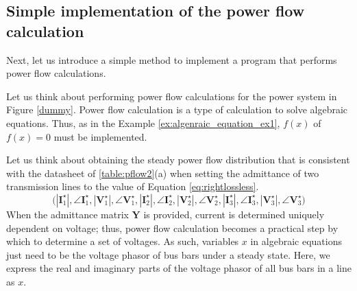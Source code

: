 \documentclass[tombow,dvipdfmx]{corona-a5-1.1}
\begin{document}
\subsection{Simple implementation of the power flow calculation}

Next, let us introduce a simple method to implement a program that performs power flow calculations.

\begin{例}\label{ex:simplepowerflow}
Let us think about performing power flow calculations for the power system in Figure \ref{dummy}.
Power flow calculation is a type of calculation to solve algebraic equations. Thus, as in the Example \nobreak\ref{ex:algenraic_equation_ex1}, $f(x)$ of $f(x)=0$ must be implemented.

Let us think about obtaining the steady power flow distribution that is consistent with the datasheet of \ref{table:pflow2}(a) when setting the admittance of two transmission lines to the value of Equation \ref{eq:rightlossless}. 
\[
\bigl(
|\bm{I}_1^{\star}|,\angle \bm{I}_1^{\star},
|\bm{V}_1^{\star}|,\angle \bm{V}_1^{\star},
|\bm{I}_2^{\star}|,\angle \bm{I}_2^{\star},
|\bm{V}_2^{\star}|,\angle \bm{V}_2^{\star},
|\bm{I}_3^{\star}|,\angle \bm{I}_3^{\star},
|\bm{V}_3^{\star}|,\angle \bm{V}_3^{\star}
\bigr)
\]
When the admittance matrix $\bm Y$ is provided, current is determined uniquely dependent on voltage; thus, power flow calculation becomes a practical step by which to determine a set of voltages.
As such, variables $x$ in algebraic equations just need to be the voltage phasor of bus bars under a steady state.
Here, we express the real and imaginary parts of the voltage phasor of all bus bars in a line as $x$.


\end{例}
\end{document}
